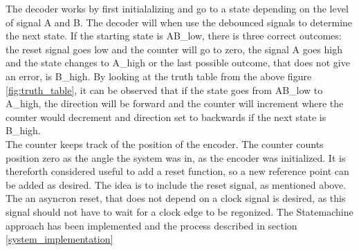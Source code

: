 \documentclass[../../../main]{subfiles}
\begin{document}
The decoder works by first initialalizing and go to a state depending on the level of signal A and B. The decoder will when use the debounced signals to determine the next state. If the starting state is AB\_low, there is three correct outcomes: the reset signal goes low and the counter will go to zero, the signal A goes high and the state changes to A\_high or the last possible outcome, that does not give an error, is B\_high. By looking at the truth table from the above figure \ref{fig:truth_table}, it can be observed that if the state goes from AB\_low to A\_high, the direction will be forward and the counter will increment where the counter would decrement and direction set to backwards if the next state is B\_high.\\
The counter keeps track of the position of the encoder. The counter counts position zero as the angle the system was in, as the encoder was initialized. It is thereforth considered useful to add a reset function, so a new reference point can be added as desired. The idea is to include the reset signal, as mentioned above. The an asyncron reset, that does not depend on a clock signal is desired, as this signal should not have to wait for a clock edge to be regonized. The Statemachine approach has been implemented and the process described in section \ref{system_implementation}

\begin{figure}[H]
  \centering
  \def\svgwidth{\columnwidth}
  \fontsize{9}{9}\selectfont
  
  \caption{}
\end{figure}
\end{document}
